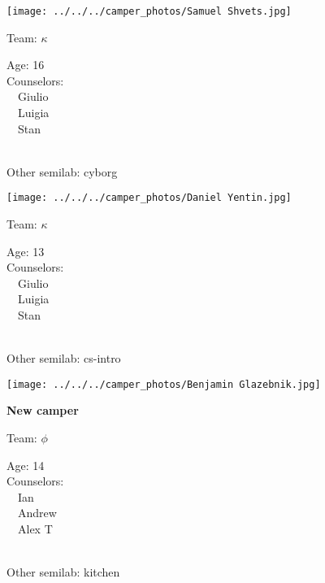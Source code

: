 \documentclass[10pt,letterpaper, landscape]{article}
\begin{document}
\horizontalshiftfornextsticker
\renewcommand{\baselinestretch}{1} \begin{sticker}
\noindent\begin{minipage}{0.5\textwidth}\texttt{[image: ../../../camper\_photos/Samuel Shvets.jpg]}\end{minipage}\begin{minipage}{0.45\textwidth}
Team: {\Large $\kappa$}

Age:        16\\
Counselors: \\\ \ Giulio\\\ \ Luigia\\\ \ Stan\\
\end{minipage} \\ \vspace{0.07in}
Other semilab: cyborg
\end{sticker}
\horizontalshiftfornextsticker
\renewcommand{\baselinestretch}{1} \begin{sticker}
\noindent\begin{minipage}{0.5\textwidth}\texttt{[image: ../../../camper\_photos/Daniel Yentin.jpg]}\end{minipage}\begin{minipage}{0.45\textwidth}
Team: {\Large $\kappa$}

Age:        13\\
Counselors: \\\ \ Giulio\\\ \ Luigia\\\ \ Stan\\
\end{minipage} \\ \vspace{0.07in}
Other semilab: cs-intro
\end{sticker}
\verticalshiftfornextsticker
\renewcommand{\baselinestretch}{1} \begin{sticker}
\noindent\begin{minipage}{0.5\textwidth}\texttt{[image: ../../../camper\_photos/Benjamin Glazebnik.jpg]}\end{minipage}\begin{minipage}{0.45\textwidth}
\textbf{New camper} 

Team: {\Large $\phi$}

Age:        14\\
Counselors: \\\ \ Ian\\\ \ Andrew\\\ \ Alex T\\
\end{minipage} \\ \vspace{0.07in}
Other semilab: kitchen
\end{sticker}
\end{document}
